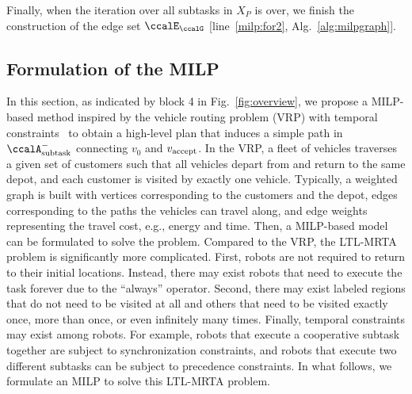 \documentclass[Afour,sageh,times]{sagej}
\newcommand{\auto}[1]{\ccalA_{\textup{#1}}}
\newcommand{\vertex}[1]{v_{\textup{#1}}}
\begin{document}



Finally,  when the iteration over all subtasks in $X_{P}$ is over, we finish the construction of  the edge set $\ccalE_\ccalG$ [line~\ref{milp:for2},  Alg.~\ref{alg:milpgraph}].

\subsection{Formulation of the MILP}\label{sec:milp}
In this section, as indicated by block 4 in Fig.~\ref{fig:overview}, we propose a MILP-based method inspired by the vehicle routing problem (VRP) with temporal constraints~\cite{bredstrom2008combined} to obtain a high-level plan that induces a simple path in $\auto{subtask}^-$ connecting $v_0$ and $\vertex{accept}$. In the VRP, a fleet of vehicles traverses a given set of customers such that all vehicles depart from and return to the same depot, and each customer is visited by exactly one vehicle. Typically, a weighted graph is built with vertices corresponding to the customers and the depot, edges corresponding to the paths the vehicles can travel along, and edge weights representing the travel cost, e.g., energy and time. Then,  a MILP-based model can be formulated to solve the problem. Compared to the VRP, the LTL-MRTA problem is significantly more complicated. First, robots are not required to return to their initial locations. Instead, there may exist robots that need to execute the task forever due to the  ``always'' operator. Second, there may exist labeled regions that do not need to be visited at all and others that need to be visited exactly once,  more than once, or even infinitely many times. Finally, temporal constraints may exist among robots. For example, robots that execute a cooperative subtask together are subject to synchronization constraints, and robots that execute two different subtasks can be subject to precedence constraints. In what follows, we formulate an MILP to solve this LTL-MRTA problem.
\end{document}
